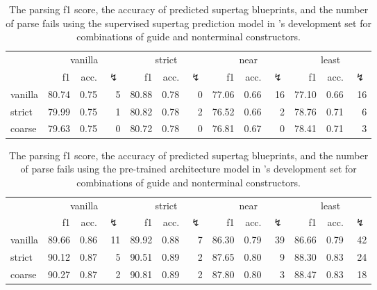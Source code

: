 \documentclass[../../document.tex]{subfiles}
\begin{document}
    \begin{table}
        \caption{\label{tbl:gridsearch:1:2}
            The parsing f1 score, the accuracy of predicted supertag blueprints, and the number of parse fails using the supervised supertag prediction model in \negra{}'s development set for combinations of guide and nonterminal constructors.
        }
        \centering
        \vspace{.2cm}
        \begin{tabular}{l|rrr|rrr|rrr|rrr}
            \toprule
                        & \multicolumn{3}{c|}{vanilla} & \multicolumn{3}{c|}{strict} & \multicolumn{3}{c|}{near} & \multicolumn{3}{c}{least}  \\
                        & f1 & acc. & $\lightning$ & f1 & acc. & $\lightning$ & f1 & acc. & $\lightning$ & f1 & acc. & $\lightning$  \\ \hline
            vanilla     & 80.74 & 0.75 & 5 & 80.88 & 0.78 & 0 & 77.06 & 0.66 & 16 & 77.10 & 0.66 & 16 \\
            strict      & 79.99 & 0.75 & 1 & 80.82 & 0.78 & 2 & 76.52 & 0.66 &  2 & 78.76 & 0.71 &  6 \\
            coarse      & 79.63 & 0.75 & 0 & 80.72 & 0.78 & 0 & 76.81 & 0.67 &  0 & 78.41 & 0.71 &  3 \\
            \bottomrule
        \end{tabular}
    \end{table}
    
    
    \begin{table}
        \caption{\label{tbl:gridsearch:1:3}
            The parsing f1 score, the accuracy of predicted supertag blueprints, and the number of parse fails using the pre-trained architecture model in \negra{}'s development set for combinations of guide and nonterminal constructors.
        }
        \centering
        \vspace{.2cm}
        \begin{tabular}{l|rrr|rrr|rrr|rrr}
            \toprule
                        & \multicolumn{3}{c|}{vanilla} & \multicolumn{3}{c|}{strict} & \multicolumn{3}{c|}{near} & \multicolumn{3}{c}{least}  \\
                        & f1 & acc. & $\lightning$ & f1 & acc. & $\lightning$ & f1 & acc. & $\lightning$ & f1 & acc. & $\lightning$  \\ \hline
            vanilla     & 89.66 & 0.86 & 11 & 89.92 & 0.88 & 7 & 86.30 & 0.79 & 39 & 86.66 & 0.79 & 42 \\
            strict      & 90.12 & 0.87 &  5 & 90.51 & 0.89 & 2 & 87.65 & 0.80 &  9 & 88.30 & 0.83 & 24 \\
            coarse      & 90.27 & 0.87 &  2 & 90.81 & 0.89 & 2 & 87.80 & 0.80 &  3 & 88.47 & 0.83 & 18 \\
            \bottomrule
        \end{tabular}
    \end{table}
    
\end{document}

